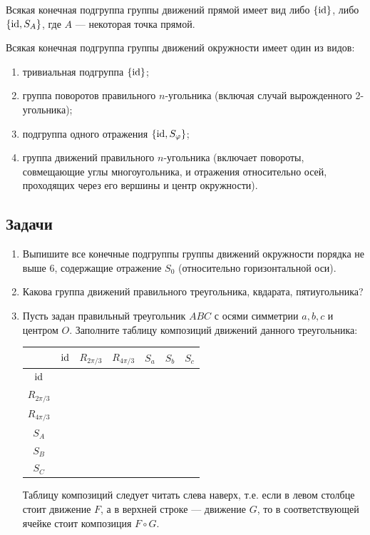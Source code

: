Всякая конечная подгруппа группы движений прямой имеет вид либо $\{\mathrm{id}\}$, либо $\{\mathrm{id},S_A\}$, где $A$ --- некоторая точка прямой.

Всякая конечная подгруппа группы движений окружности имеет один из видов:
\begin{enumerate}
\item тривиальная подгруппа $\{\mathrm{id}\}$;
\item группа поворотов правильного $n$-угольника (включая случай вырожденного 2-угольника);
\item подгруппа одного отражения $\{\mathrm{id},S_\varphi\}$;
\item группа движений правильного $n$-угольника (включает повороты, совмещающие углы многоугольника, и отражения относительно осей, проходящих через его вершины и центр окружности).
\end{enumerate}


\subsection*{Задачи}

\begin{enumerate}
\item Выпишите все конечные подгруппы группы движений окружности порядка не выше 6, содержащие отражение $S_0$ (относительно горизонтальной оси).
\item Какова группа движений правильного треугольника, квдарата, пятиугольника?
\item Пусть задан правильный треугольник $ABC$ с осями симметрии $a,b,c$ и центром $O$. Заполните таблицу композиций движений данного треугольника:
\begin{table}[htb!]\begin{center}
\begin{tabular}{c||c|c|c||c|c|c|}
             & $\mathrm{id}$        & $R_{2\pi/3}$ & $R_{4\pi/3}$ & $S_a$        & $S_b$        & $S_c$  \\
\hline\hline
$\mathrm{id}$        & \phantom{$R_{2\pi/3}$} & \phantom{$R_{2\pi/3}$} & \phantom{$R_{2\pi/3}$} & \phantom{$R_{2\pi/3}$} & \phantom{$R_{2\pi/3}$} & \phantom{$R_{2\pi/3}$} \\  \hline
$R_{2\pi/3}$ &  &  &  &  &  &  \\  \hline
$R_{4\pi/3}$ &  &  &  &  &  &  \\  \hline
$S_A$        &  &  &  &  &  &  \\  \hline
$S_B$        &  &  &  &  &  &  \\  \hline
$S_C$        &  &  &  &  &  &  \\  \hline
\end{tabular}
\end{center}\end{table}

Таблицу композиций следует читать слева наверх, т.е. если в левом столбце стоит движение $F$, а в верхней строке --- движение $G$, то в соответствующей ячейке стоит композиция $F\circ G$.
\end{enumerate}



